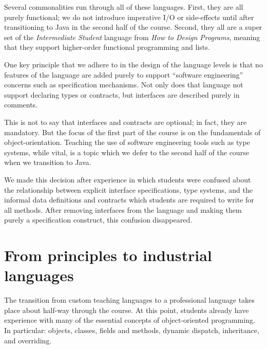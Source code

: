 \documentclass[submission,copyright]{eptcs}
\def\htdp{\emph{How to Design Programs}\xspace}
\begin{document}
Several commonalities run through all of these languages.  First, they
are all purely functional; we do not introduce imperative I/O or
side-effects until after transitioning to Java in the second half of
the course.  Second, they all are a super set of the
\emph{Intermediate Student} language from \htdp, meaning that they
support higher-order functional programming and lists. 

One key principle that we adhere to in the design of the language
levels is that no features of the language are added purely to support
``software engineering'' concerns such as specification mechanisms.
Not only does that language not support declaring types or contracts,
but interfaces are described purely in comments.

This is not to say that interfaces and contracts are optional; in
fact, they are mandatory.  But the focus of the first part of the
course is on the fundamentals of object-orientation.  Teaching the use
of software engineering tools such as type systems, while vital, is a
topic which we defer to the second half of the course when we
transition to Java. 

We made this decision after experience in which students were confused
about the relationship between explicit interface specifications, type
systems, and the informal data definitions and contracts which
students are required to write for all methods.  After removing
interfaces from the language and making them purely a specification
construct, this confusion disappeared.











\section{From principles to industrial languages}
\label{sec:industrial}

The transition from custom teaching languages to a professional
language takes place about half-way through the course.  At this
point, students already have experience with many of the essential
concepts of object-oriented programming. In particular: objects,
classes, fields and methods, dynamic dispatch, inheritance, and
overriding.
\end{document}
